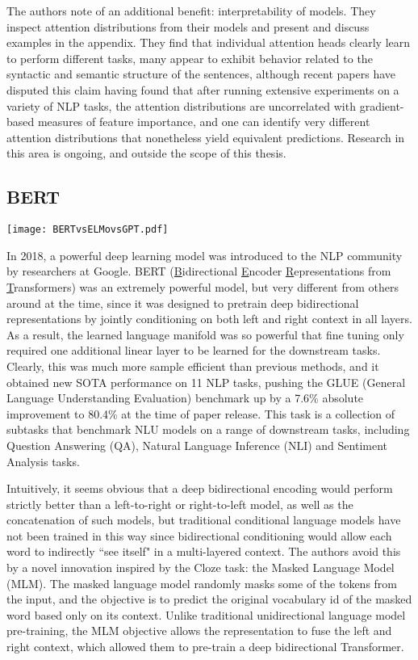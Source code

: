 {{The authors note of an additional benefit: interpretability of models. They inspect attention distributions from their models and present and discuss examples in the appendix. They find that individual attention heads clearly learn to perform different tasks, many appear to exhibit behavior related to the syntactic and semantic structure of the sentences, although recent papers \cite{Jain} have disputed this claim having found that after running extensive experiments on a variety of NLP tasks, the attention distributions are uncorrelated with gradient-based measures of feature importance, and one can identify very different attention distributions that nonetheless yield equivalent predictions. Research in this area is ongoing, and outside the scope of this thesis.

\subsection{BERT} \label{section:background:bert}
\begin{center}
	\texttt{[image: BERTvsELMovsGPT.pdf]}
\end{center}
In 2018, a powerful deep learning model was introduced to the NLP community by researchers at Google. BERT (\underline{B}idirectional \underline{E}ncoder \underline{R}epresentations from \underline{T}ransformers) \cite{Devlin2018} was an extremely powerful model, but very different from others around at the time, since it was designed to pretrain deep bidirectional representations by jointly conditioning on both left and right context in all layers. As a result, the learned language manifold was so powerful that fine tuning only required one additional linear layer to be learned for the downstream tasks. Clearly, this was much more sample efficient than previous methods, and it obtained new SOTA performance on 11 NLP tasks, pushing the GLUE (General Language Understanding Evaluation) benchmark \cite{Wang2018} up by a 7.6\% absolute improvement to 80.4\% at the time of paper release. This task is a collection of subtasks that benchmark NLU models on a range of downstream tasks, including Question Answering (QA), Natural Language Inference (NLI) and Sentiment Analysis tasks.

Intuitively, it seems obvious that a deep bidirectional encoding would perform strictly better than a left-to-right or right-to-left model, as well as the concatenation of such models, but traditional conditional language models have not been trained in this way since bidirectional conditioning would allow each word to indirectly ``see itself" in a multi-layered context. The authors avoid this by a novel innovation inspired by the Cloze \cite{Taylor1953} task: the Masked Language Model (MLM). The masked language model randomly masks some of the tokens from the input, and the objective is to predict the original vocabulary id of the masked word based only on its context. Unlike traditional unidirectional language model pre-training, the MLM objective allows the representation to fuse the left and right context, which allowed them to pre-train a deep bidirectional Transformer.

}}

